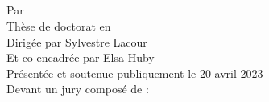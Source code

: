

\begin{mytitlepage}

	\begin{center}
		
		\vspace*{0.3cm}
		\LARGE\textbf{\univname} \\
		\vspace{0.2cm}
		\Large\textbf{\schoolname} \\
		\vspace{0.3cm}
		\Large\textbf{\labname} \\
		\vspace{1cm}
		\huge{\textbf{\ttitle}} \\
		\vspace{0.8cm}
		\large{Par \authorname} \\
		\vspace{0.6cm}
		\large{Thèse de doctorat en \subjectname} \\
		\vspace{0.6cm}
		\large{Dirigée par Sylvestre Lacour} \\
            \large{Et co-encadrée par Elsa Huby} \\
		
		\normalsize
		\vspace{0.7cm}
		Présentée et soutenue publiquement le 20 avril 2023 \\
		\vspace{0.7cm}
		Devant un jury composé de :
		
		\newlength{\espacejury}
		\setlength{\espacejury}{0.1cm}
		
		\small
		

\end{center}
\end{mytitlepage}
